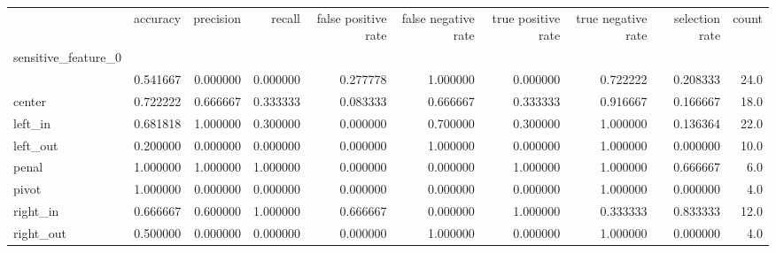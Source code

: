 \begin{tabular}{lrrrrrrrrr}
\toprule
{} &  accuracy &  precision &    recall &  false positive rate &  false negative rate &  true positive rate &  true negative rate &  selection rate &  count \\
sensitive\_feature\_0 &           &            &           &                      &                      &                     &                     &                 &        \\
\midrule
                    &  0.541667 &   0.000000 &  0.000000 &             0.277778 &             1.000000 &            0.000000 &            0.722222 &        0.208333 &   24.0 \\
center              &  0.722222 &   0.666667 &  0.333333 &             0.083333 &             0.666667 &            0.333333 &            0.916667 &        0.166667 &   18.0 \\
left\_in             &  0.681818 &   1.000000 &  0.300000 &             0.000000 &             0.700000 &            0.300000 &            1.000000 &        0.136364 &   22.0 \\
left\_out            &  0.200000 &   0.000000 &  0.000000 &             0.000000 &             1.000000 &            0.000000 &            1.000000 &        0.000000 &   10.0 \\
penal               &  1.000000 &   1.000000 &  1.000000 &             0.000000 &             0.000000 &            1.000000 &            1.000000 &        0.666667 &    6.0 \\
pivot               &  1.000000 &   0.000000 &  0.000000 &             0.000000 &             0.000000 &            0.000000 &            1.000000 &        0.000000 &    4.0 \\
right\_in            &  0.666667 &   0.600000 &  1.000000 &             0.666667 &             0.000000 &            1.000000 &            0.333333 &        0.833333 &   12.0 \\
right\_out           &  0.500000 &   0.000000 &  0.000000 &             0.000000 &             1.000000 &            0.000000 &            1.000000 &        0.000000 &    4.0 \\
\bottomrule
\end{tabular}
